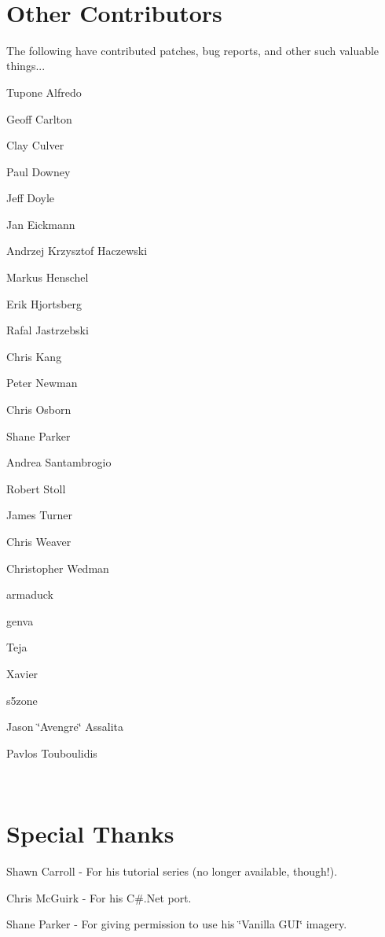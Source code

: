 ~\newline
 \hypertarget{authors_authors_sec_5}{}\section{Other Contributors}\label{authors_authors_sec_5}
The following have contributed patches, bug reports, and other such valuable things...
\begin{DoxyItemize}
\item Tupone Alfredo
\item Geoff Carlton
\item Clay Culver
\item Paul Downey
\item Jeff Doyle
\item Jan Eickmann
\item Andrzej Krzysztof Haczewski
\item Markus Henschel
\item Erik Hjortsberg
\item Rafal Jastrzebski
\item Chris Kang
\item Peter Newman
\item Chris Osborn
\item Shane Parker
\item Andrea Santambrogio
\item Robert Stoll
\item James Turner
\item Chris Weaver
\item Christopher Wedman
\item armaduck
\item genva
\item Te\textquotesingle{}ja
\item Xavier
\item s5zone
\item Jason \char`\"{}\+Avengre\char`\"{} Assalita
\item Pavlos Touboulidis
\end{DoxyItemize}

~\newline
 \hypertarget{authors_authors_sec_6}{}\section{Special Thanks}\label{authors_authors_sec_6}

\begin{DoxyItemize}
\item Shawn Carroll -\/ For his tutorial series (no longer available, though!).
\item Chris Mc\+Guirk -\/ For his C\#.Net port.
\item Shane Parker -\/ For giving permission to use his \char`\"{}\+Vanilla G\+U\+I\char`\"{} imagery.
\end{DoxyItemize}


